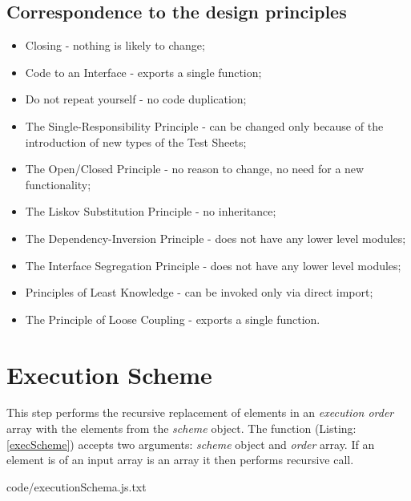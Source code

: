 \subsection{Correspondence to  the design principles}
\begin{itemize}
	\item Closing - nothing is likely to change;
	\item Code to an Interface - exports a single function;
	\item Do not repeat yourself - no code duplication;
	\item The Single-Responsibility Principle - can be changed only because of the introduction of new types of the Test Sheets;
	\item The Open/Closed Principle - no reason to change, no need for a new functionality;
	\item The Liskov Substitution Principle - no inheritance;
	\item The Dependency-Inversion Principle - does not have any lower level modules;
	\item The Interface Segregation Principle - does not have any lower level modules;
	\item Principles of Least Knowledge -  can be invoked only via direct import;
	\item The Principle of Loose Coupling - exports a single function.
\end{itemize}

\section{Execution Scheme}
\label{sec:execScheme}
This step performs the recursive replacement of elements in an \textit{execution order} array with the elements from the \textit{scheme} object. The function (Listing: \ref{execScheme}) accepts two arguments: \textit{scheme} object and \textit{order} array. If an element is of an input array is an array it then performs recursive call.


{code/executionSchema.js.txt}
